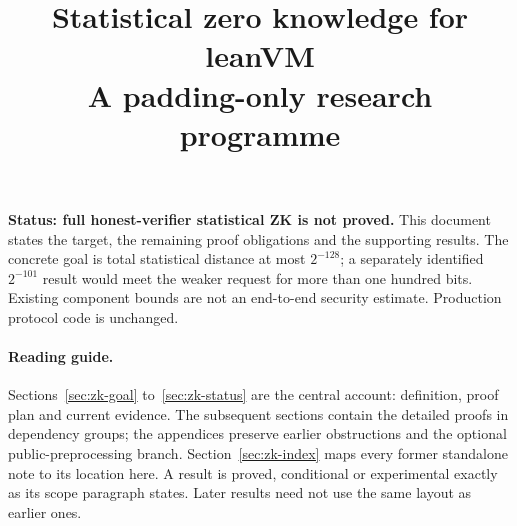 \documentclass[11pt]{article}
\title{Statistical zero knowledge for leanVM\\A padding-only research programme}
\author{}
\date{}
\begin{document}
\maketitle
\vspace{-2em}
\noindent\textbf{Status: full honest-verifier statistical ZK is not proved.} This document states the target, the remaining proof obligations and the supporting results. The concrete goal is total statistical distance at most $2^{-128}$; a separately identified $2^{-101}$ result would meet the weaker request for more than one hundred bits. Existing component bounds are not an end-to-end security estimate. Production protocol code is unchanged.

\paragraph{Reading guide.} Sections~\ref{sec:zk-goal} to~\ref{sec:zk-status} are the central account: definition, proof plan and current evidence. The subsequent sections contain the detailed proofs in dependency groups; the appendices preserve earlier obstructions and the optional public-preprocessing branch. Section~\ref{sec:zk-index} maps every former standalone note to its location here. A result is proved, conditional or experimental exactly as its scope paragraph states. Later results need not use the same layout as earlier ones.

\tableofcontents
\clearpage



\clearpage

\clearpage

\clearpage

\clearpage

\clearpage

\clearpage

\clearpage

\clearpage
\appendix

\clearpage

\clearpage

\clearpage

\end{document}
